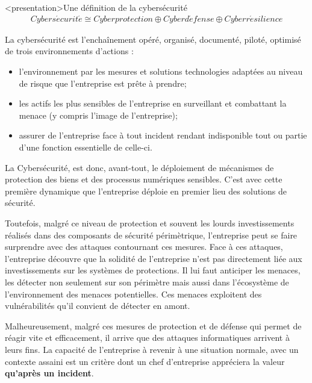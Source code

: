 \begin{frame}<presentation>{Une définition de la cybersécurité}
\begin{align}
Cybers\acute{e}curit\acute{e} \cong Cyberprotection\oplus Cyberd\acute{e}fense \oplus Cyberr\acute{e}silience
\end{align}
\end{frame}

\begin{frame}

La cybersécurité est l'enchaînement opéré, organisé, documenté, piloté, optimisé de trois environnements d'actions :
\begin{itemize}
 \item {} l'environnement par les mesures et solutions technologies adaptées au niveau de risque que l'entreprise est prête à prendre; 
 \item {} les actifs les plus sensibles de l'entreprise en surveillant et combattant la menace (y compris l'image de l'entreprise);
 \item assurer  de l'entreprise face à tout incident rendant indisponible tout ou partie d'une fonction essentielle de celle-ci.
\end{itemize}

\end{frame}

La Cybersécurité, est donc, avant-tout, le déploiement de mécanismes de protection des biens et des processus numériques sensibles. C’est avec cette première dynamique que l’entreprise déploie en premier lieu des solutions de sécurité. 

Toutefois, malgré ce niveau de protection et souvent les lourds investissements réalisés dans des composants de sécurité périmètrique, l’entreprise peut se faire surprendre avec des attaques contournant ces mesures. Face à ces attaques, l’entreprise découvre que la solidité de l’entreprise n’est pas directement liée aux investissements sur les systèmes de protections. Il lui faut anticiper les menaces, les détecter non seulement sur son périmètre mais aussi dans l’écosystème de l’environnement des menaces potentielles. Ces menaces exploitent des vulnérabilités qu’il convient de détecter en amont.

Malheureusement, malgré ces mesures de protection et de défense qui permet de réagir vite et efficacement, il arrive que des attaques informatiques arrivent à leurs fins. La capacité de l’entreprise à revenir à une situation normale, avec un contexte assaini est un critère dont un chef d’entreprise appréciera la valeur\textbf{ qu’après un incident}.

